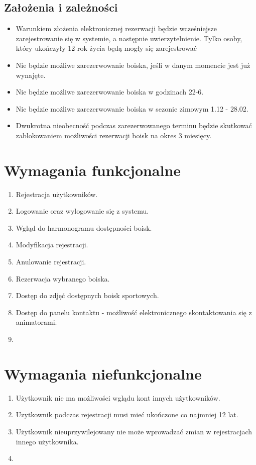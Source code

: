 \documentclass[a4paper, portrait,11pt]{article}
\begin{document}
\subsection {Założenia i zależności}
\begin{itemize}
	\item Warunkiem złożenia elektronicznej rezerwacji będzie 			wcześniejsze zarejestrowanie się w systemie, a następnie uwierzytelnienie. Tylko osoby, który ukończyły 12 rok życia będą mogły się zarejestrować
	\item Nie będzie możliwe zarezerwowanie boiska, jeśli w danym momencie jest już wynajęte.
	\item Nie będzie możliwe zarezerwowanie boiska w godzinach 22-6.
	\item Nie będzie możliwe zarezerwowanie boiska w sezonie zimowym 1.12 - 28.02.
	\item Dwukrotna nieobecność podczas zarezerwowanego terminu będzie skutkować zablokowaniem możliwości rezerwacji boisk na okres 3 miesięcy. 
\end{itemize}

\section {Wymagania funkcjonalne}
\begin{enumerate}
	\item Rejestracja użytkowników.
	\item Logowanie oraz wylogowanie się z systemu.
	\item Wgląd do harmonogramu dostępności boisk.
	\item Modyfikacja rejestracji.
	\item Anulowanie rejestracji.
	\item Rezerwacja wybranego boiska.
	\item Dostęp do zdjęć dostępnych boisk sportowych.
	\item Dostęp do panelu kontaktu - możliwość elektronicznego skontaktowania się z animatorami.
	\item 
\end{enumerate}

\section {Wymagania niefunkcjonalne}
\begin{enumerate}
	\item Użytkownik nie ma możliwości wglądu kont innych użytkowników.
	\item Uzytkownik podczas rejestracji musi mieć ukończone co najmniej 12 lat.
	\item Użytkownik nieuprzywilejowany nie może wprowadzać zmian w rejestracjach innego użytkownika.
	\item 
\end{enumerate}
\end{document}
